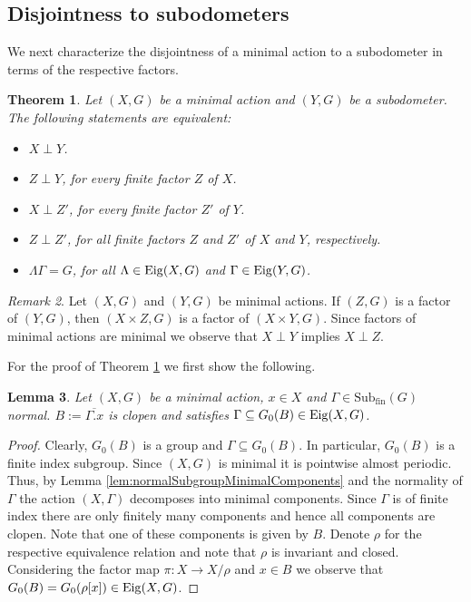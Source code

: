 \documentclass[12pt, reqno]{amsart}
\newtheorem{theorem}{Theorem}[section]
\newtheorem{lemma}[theorem]{Lemma}
\theoremstyle{definition}
\theoremstyle{remark}
\newtheorem{remark}[theorem]{Remark}
\numberwithin{equation}{section}
\theoremstyle{theorem}
\theoremstyle{remark}
\def\subfin{{\operatorname{Sub_{fin}}}}
\def\Eig{{\rm Eig}}
\begin{document}
\subsection{Disjointness to subodometers}
\label{subsec:DisjointnessOfSubodometers_DisjointnessToSubodometers}
We next characterize the disjointness of a minimal action to a subodometer in terms of the respective factors. 

\begin{theorem}
\label{the:disjointnessCharacterization}
    Let $(X,G)$ be a minimal action and $(Y,G)$ be a subodometer. 
    The following statements are equivalent:  
    \begin{itemize}
        \item[(i)] $X\perp Y$.
        \item[(ii)] $Z\perp Y$, for every finite factor $Z$ of $X$. 
        \item[(iii)] $X \perp Z'$, for every finite factor $Z'$ of $Y$.
        \item[(iv)] $Z \perp Z'$, for all finite factors $Z$ and $Z'$ of $X$ and $Y$, respectively.
        \item[(v)] $\Lambda\Gamma=G$, for all $\Lambda\in \Eig(X,G)$ and $\Gamma\in \Eig(Y,G)$.
    \end{itemize}
\end{theorem}

\begin{remark}\cite[Proposition~7.1]{auslander1988minimal}
\label{rem:disjointnessFactorInheritance}
    Let $(X,G)$ and $(Y,G)$ be minimal actions.
    If $(Z,G)$ is a factor of $(Y,G)$, then $(X\times Z,G)$ is a factor of $(X\times Y,G)$. Since factors of minimal actions are minimal we observe that $X\perp Y$ implies $X\perp Z$.
\end{remark}

For the proof of Theorem \ref{the:disjointnessCharacterization} we first show the following. 

\begin{lemma}
\label{lem:preparationForDisjointnessCharacterization}
    Let $(X,G)$ be a minimal action, $x\in X$ and $\Gamma\in \subfin(G)$ normal. 
    $B:=\overline{\Gamma.x}$ is clopen and satisfies $\Gamma\subseteq G_0(B)\in \Eig(X,G)$. 
\end{lemma}
\begin{proof} 
    Clearly, $G_0(B)$ is a group and $\Gamma\subseteq G_0(B)$.
    In particular, $G_0(B)$ is a finite index subgroup. 
    Since $(X,G)$ is minimal it is pointwise almost periodic.
    Thus, by Lemma \ref{lem:normalSubgroupMinimalComponents} and the normality of $\Gamma$ the action $(X,\Gamma)$ decomposes into minimal components. 
    Since $\Gamma$ is of finite index there are only finitely many components and hence all components are clopen. 
    Note that one of these components is given by $B$. 
    Denote $\rho$ for the respective equivalence relation and note that $\rho$ is invariant and closed. 
    Considering the factor map $\pi\colon X\to X/\rho$ and $x\in B$ we observe that $G_0(B)=G_0(\rho[x])\in \Eig(X,G)$.
\end{proof}
\end{document}
